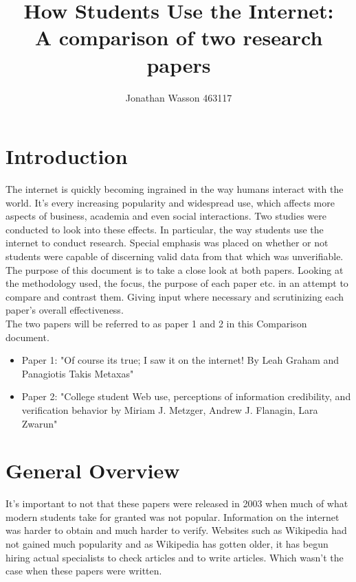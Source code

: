 \documentclass[11pt]{article}
\title{How Students Use the Internet:\\
A comparison of two research papers}
\author{Jonathan Wasson 463117}
\begin{document}
\maketitle

\clearpage

\tableofcontents
\clearpage


\section{Introduction}

The internet is quickly becoming ingrained in the way humans interact with the world. It's every increasing popularity and widespread use, which affects more aspects of business, academia and even social interactions. Two studies were conducted to look into these effects. In particular, the way students use the internet to conduct research. Special emphasis was placed on whether or not students were capable of discerning valid data from that which was unverifiable.
\\

The purpose of this document is to take a close look at both papers. Looking at the methodology used, the focus, the purpose of each paper etc. in an attempt to compare and contrast them. Giving input where necessary and scrutinizing each paper's overall effectiveness. 
\\

The two papers will be referred to as paper 1 and 2 in this Comparison document.
\begin{itemize}
\item Paper 1: "Of course its true; I saw it on the internet! By Leah Graham and Panagiotis Takis Metaxas"

\item Paper 2: "College student Web use, perceptions of information credibility, and verification behavior by Miriam J. Metzger, Andrew J. Flanagin, Lara Zwarun"
\end{itemize}


\section{General Overview}

It's important to not that these papers were released in 2003 when much of what modern students take for granted was not popular. Information on the internet was harder to obtain and much harder to verify. Websites such as Wikipedia had not gained much popularity and as Wikipedia has gotten older, it has begun hiring actual specialists to check articles and to write articles. Which wasn't the case when these papers were written. \citep{voss2005measuring}
\\
\end{document}
